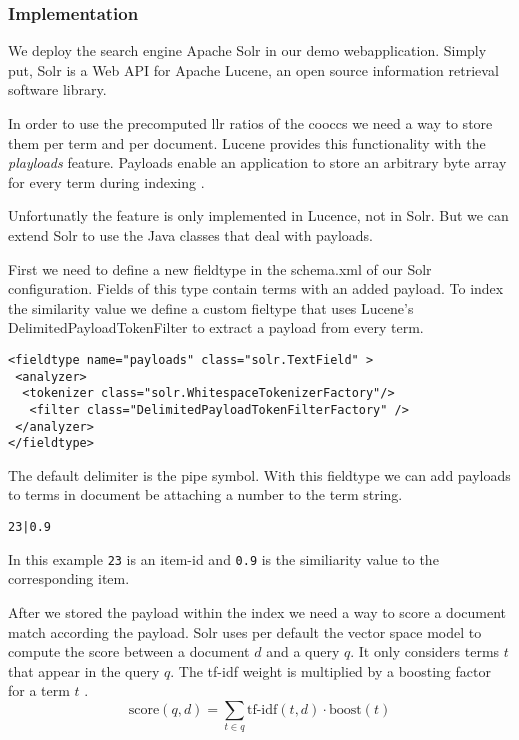 \subsubsection{Implementation}
\label{sec:solrimpl}
We deploy the search engine Apache Solr in our demo webapplication. Simply put, Solr is a Web API for Apache Lucene, an open source information retrieval software library. 

In order to use the precomputed \gls{llr} ratios of the \glspl{coocc} we need a way to store them per term and per document. Lucene provides this functionality with the \emph{playloads} feature. Payloads enable an application to store an arbitrary byte array for every term during indexing \cite{McCandless}.

Unfortunatly the feature is only implemented in Lucence, not in Solr. But we can extend Solr to use the Java classes that deal with payloads.

First we need to define a new fieldtype in the schema.xml of our Solr configuration. Fields of this type contain terms with an added payload.
To index the similarity value we define a custom fieltype that uses Lucene's DelimitedPayloadTokenFilter to extract a payload from every term. 

\begin{lstlisting}[caption={Fieldtype definition for field with payload.}]
<fieldtype name="payloads" class="solr.TextField" >
 <analyzer>
  <tokenizer class="solr.WhitespaceTokenizerFactory"/>
   <filter class="DelimitedPayloadTokenFilterFactory" />
 </analyzer>
</fieldtype>
\end{lstlisting}
The default delimiter is the pipe symbol. With this fieldtype we can add payloads to terms in document be attaching a number to the term string.
\begin{verbatim}
23|0.9
\end{verbatim}
In this example \verb|23| is an item-id and \verb|0.9| is the similiarity value to the corresponding item.

After we stored the payload within the index we need a way to score a document match according the payload.
Solr uses per default the vector space model to compute the score between a document $d$ and a query $q$. It only considers terms $t$ that appear in the query $q$. The tf-idf weight is multiplied by a boosting factor for a term $t$ \cite{grainger}.  
\begin{equation}
\label{eq:solrsim}
\text{score}(q,d) = \sum_{t \in q} \text{tf-idf}(t,d) \cdot \text{boost}(t)
\end{equation}

